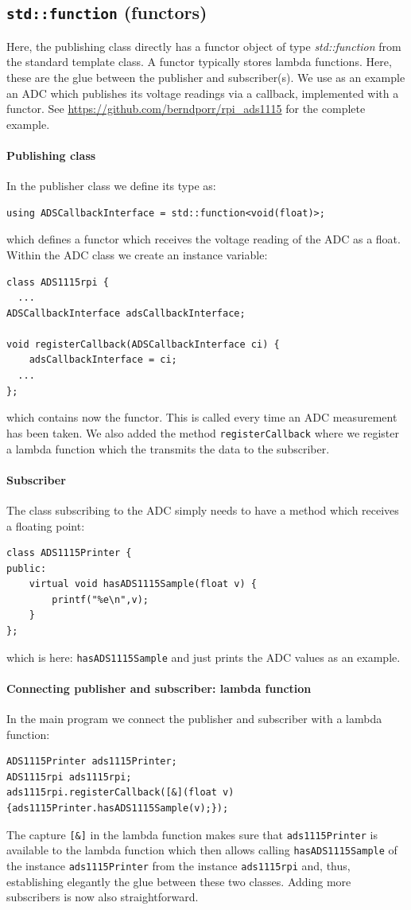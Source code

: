\documentclass[12pt]{report}
\begin{document}
\subsection{\texttt{std::function} (functors)}
Here, the publishing class directly has a functor object of type \textsl{std::function}
from the standard template class.
A functor typically stores lambda functions. Here, these
are the glue between the publisher and subscriber(s). We use as an example
an ADC which publishes its voltage readings via a callback, implemented with
a functor.
See \url{https://github.com/berndporr/rpi_ads1115} for the complete example.
\paragraph{Publishing class}
In the publisher class we define its type as:
\begin{verbatim}
using ADSCallbackInterface = std::function<void(float)>;
\end{verbatim}
which defines a functor which receives the voltage reading of the ADC as a float.
Within the ADC class we create an instance variable:
\begin{verbatim}
class ADS1115rpi {
  ...
ADSCallbackInterface adsCallbackInterface;

void registerCallback(ADSCallbackInterface ci) {
	adsCallbackInterface = ci;
  ...
};
\end{verbatim}
which contains now the functor. This is called every time an ADC measurement has been taken.
We also added the method \texttt{registerCallback} where we register a lambda function
which the transmits the data to the subscriber.

\paragraph{Subscriber}
The class subscribing to the ADC simply needs to have a method which receives
a floating point:
\begin{verbatim}
class ADS1115Printer {
public:
	virtual void hasADS1115Sample(float v) {
		printf("%e\n",v);
	}
};
\end{verbatim}
which is here: \texttt{hasADS1115Sample} and just prints the ADC values as an example.

\paragraph{Connecting publisher and subscriber: lambda function}
In the main program we connect the publisher and subscriber with a
lambda function:
\begin{verbatim}
ADS1115Printer ads1115Printer;
ADS1115rpi ads1115rpi;
ads1115rpi.registerCallback([&](float v){ads1115Printer.hasADS1115Sample(v);});
\end{verbatim}
The capture \texttt{[\&]} in the lambda function makes sure that \texttt{ads1115Printer}
is available to the lambda function which then allows calling \texttt{hasADS1115Sample}
of the instance \texttt{ads1115Printer} from the instance \texttt{ads1115rpi} and, thus,
establishing elegantly the glue between these two classes. Adding more subscribers
is now also straightforward.
\end{document}
